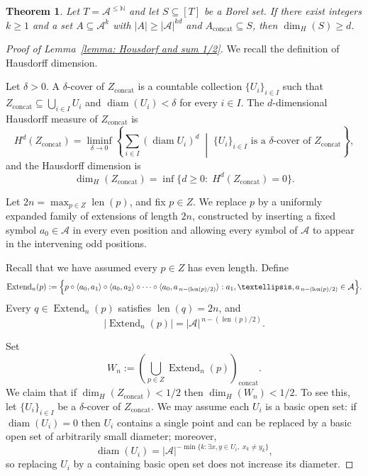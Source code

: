 \documentclass[10pt,a4paper]{amsart}
\newtheorem{theorem}{Theorem}
\begin{document}
\begin{theorem}\label{theorem Fishman game housdorf}
Let \(T=\mathcal{A}^{\le \mathbb{N}}\) and let \(S\subseteq [T]\) be a Borel set. 
If there exist integers \(k\ge 1\) and a set \(A\subseteq \mathcal{A}^k\) with \(|A|\ge |\mathcal{A}|^{k d}\) and \(A_{\mathrm{concat}} \subseteq S\),
then \(\dim_H(S)\ge d\).
\end{theorem}

\begin{proof}[Proof of Lemma~\ref{lemma: Housdorf and sum 1/2}]
We recall the definition of Hausdorff dimension.

\smallskip

Let \(\delta>0\). A \(\delta\)-cover of \(Z_{\mathrm{concat}}\) is a countable collection \(\{U_i\}_{i\in I}\) such that \(Z_{\mathrm{concat}}\subseteq\bigcup_{i\in I}U_i\) and \(\operatorname{diam}(U_i)<\delta\) for every \(i\in I\). The \(d\)-dimensional Hausdorff measure of \(Z_{\mathrm{concat}}\) is
\[
H^d(Z_{\mathrm{concat}})
=
\liminf_{\delta\to 0}
\left\{
\sum_{i\in I}(\operatorname{diam} U_i)^d
\;\middle|\;
\{U_i\}_{i\in I}\text{ is a }\delta\text{-cover of }Z_{\mathrm{concat}}
\right\},
\]
and the Hausdorff dimension is
\[
\dim_H(Z_{\mathrm{concat}})
=
\inf\{d\ge 0:\; H^d(Z_{\mathrm{concat}})=0\}.
\]

Let \(2n=\max_{p\in Z}\operatorname{len}(p)\), and fix \(p\in Z\). We replace \(p\) by a uniformly expanded family of extensions of length \(2n\), constructed by inserting a fixed symbol \(a_0\in\mathcal A\) in every even position and allowing every symbol of \(\mathcal A\) to appear in the intervening odd positions.

Recall that we have assumed every \(p\in Z\) has even length. Define
\[
\operatorname{Extend}_n(p)
:=
\Bigl\{
p \circ \langle a_0,a_1\rangle \circ \langle a_0,a_2\rangle \circ \cdots \circ
\langle a_0,a_{\,n-(\operatorname{len}(p)/2)}\rangle
:
a_1,\dots,a_{\,n-(\operatorname{len}(p)/2)}\in\mathcal A
\Bigr\}.
\]
Every \(q\in\operatorname{Extend}_n(p)\) satisfies \(\operatorname{len}(q)=2n\), and
\[
\bigl|\operatorname{Extend}_n(p)\bigr|
=|\mathcal A|^{\,n-(\operatorname{len}(p)/2)}.
\]

Set
\[
W_n := \left( \bigcup_{p\in Z} \operatorname{Extend}_n(p)\right)_{\mathrm{concat}}.
\]
We claim that if \(\dim_H(Z_{\mathrm{concat}})<1/2\) then \(\dim_H(W_n)<1/2\). To see this, let \(\{U_i\}_{i\in I}\) be a \(\delta\)-cover of \(Z_{\mathrm{concat}}\). We may assume each \(U_i\) is a basic open set: if \(\operatorname{diam}(U_i)=0\) then \(U_i\) contains a single point and can be replaced by a basic open set of arbitrarily small diameter; moreover,
\[
\operatorname{diam}(U_i)=|\mathcal A|^{-\min\{k : \exists x,y\in U_i,\; x_k\neq y_k\}},
\]
so replacing \(U_i\) by a containing basic open set does not increase its diameter.


\end{proof}
\end{document}
